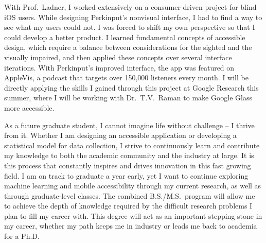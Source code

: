 With Prof.\ Ladner, I worked extensively on a consumer-driven project for blind iOS users. While designing Perkinput's nonvisual interface, I had to find a way to see what my users could not. I was forced to shift my own perspective so that I could develop a better product. I learned fundamental concepts of accessible design, which require a balance between considerations for the sighted and the visually impaired, and then applied these concepts over several interface iterations. With Perkinput's improved interface, the app was featured on AppleVis, a podcast that targets over 150,000 listeners every month. I will be directly applying the skills I gained through this project at Google Research this summer, where I will be working with Dr.\ T.V.\ Raman to make Google Glass more accessible.\vspace{2 mm}

As a future graduate student, I cannot imagine life without challenge – I thrive from it. Whether I am designing an accessible application or developing a statistical model for data collection, I strive to continuously learn and contribute my knowledge to both the academic community and the industry at large. It is this process that constantly inspires and drives innovation in this fast growing field. I am on track to graduate a year early, yet I want to continue exploring machine learning and mobile accessibility through my current research, as well as through graduate-level classes. The combined B.S./M.S.\ program will allow me to achieve the depth of knowledge required by the difficult research problems I plan to fill my career with. This degree will act as an important stepping-stone in my career, whether my path keeps me in industry or leads me back to academia for a Ph.D.\

